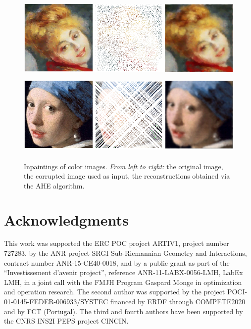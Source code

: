 \documentclass[proc]{edpsmath}
\begin{document}
\begin{figure}
  \includegraphics[height=4.0cm]{imgs/color1} \\ \vspace{.5em}
  \includegraphics[height=4.0cm]{imgs/color2}
  \caption{Inpaintings of color images. \emph{From left to right:} the original image, the corrupted image used as input, the reconstructions obtained via the AHE algorithm.
  }
  \label{fig:color-images}
\end{figure}


\section*{Acknowledgments}
This work was supported  the ERC POC project ARTIV1, project number
727283, by the ANR project SRGI Sub-Riemannian Geometry and Interactions,
contract number ANR-15-CE40-0018, and by a public grant as part of the ``Investissement d'avenir project'', reference ANR-11-LABX-0056-LMH, LabEx LMH, in a joint call with the FMJH Program Gaspard Monge in optimization and operation research. The second author was supported by the project POCI-01-0145-FEDER-006933/SYSTEC financed by ERDF through COMPETE2020 and by FCT (Portugal). The third and fourth authors have been supported by the CNRS INS2I PEPS project CINCIN.



\end{document}
